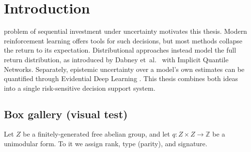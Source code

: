 \chapter*{Introduction}

 problem of sequential investment under uncertainty motivates this thesis. Modern reinforcement learning offers tools for such decisions, but most methods collapse the return to its expectation. Distributional approaches instead model the full return distribution, as introduced by Dabney et~al.~\cite{dabney2018implicit} with Implicit Quantile Networks. Separately, epistemic uncertainty over a model's own estimates can be quantified through Evidential Deep Learning \cite{sensoy2018evidential}. This thesis combines both ideas \cite{dabney2018implicit, sensoy2018evidential} into a single risk-sensitive decision support system.

\section*{Box gallery (visual test)}

\begin{definition}
 Let $Z$ be a finitely-generated free abelian group, and let $q : Z \times Z \to \mathbb{Z}$ be a unimodular form. To it we assign rank, type (parity), and signature.
 \end{definition}





